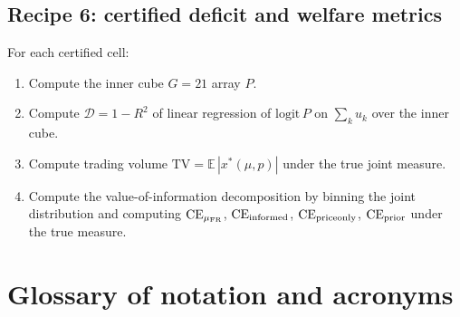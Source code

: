 \documentclass[11pt]{article}
\newcommand{\E}{\mathbb{E}}
\newcommand{\1}{\mathbf{1}}
\newcommand{\deficit}{\mathcal{D}}
\begin{document}
\subsection{Recipe 6: certified deficit and welfare metrics}

For each certified cell:
\begin{enumerate}
\item Compute the inner cube $G=21$ array $P$.
\item Compute $\deficit = 1 - R^2$ of linear regression of
$\mathrm{logit}\,P$ on $\sum_k u_k$ over the inner cube.
\item Compute trading volume $\mathrm{TV} = \E\,|x^*(\mu, p)|$
under the true joint measure.
\item Compute the value-of-information decomposition by binning the
joint distribution and computing $\mathrm{CE}_{\mu_{\rm FR}}$,
$\mathrm{CE}_{\rm informed}$, $\mathrm{CE}_{\rm priceonly}$,
$\mathrm{CE}_{\rm prior}$ under the true measure.
\end{enumerate}

\section{Glossary of notation and acronyms}
\end{document}
